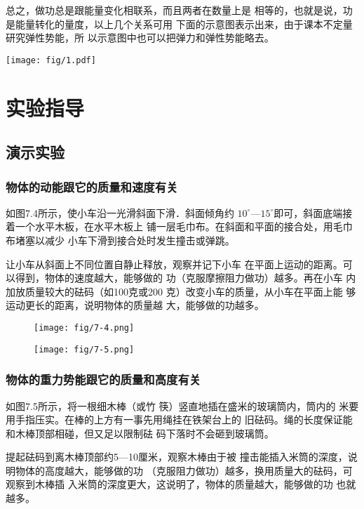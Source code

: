 总之，做功总是跟能量变化相联系，而且两者在数量上是
相等的，也就是说，功是能量转化的量度，以上几个关系可用
下面的示意图表示出来，由于课本不定量研究弹性势能，所
以示意图中也可以把弹力和弹性势能略去。

\begin{center}
\texttt{[image: fig/1.pdf]}
\end{center}

\section{实验指导}
\subsection{演示实验}
\subsubsection{物体的动能跟它的质量和速度有关}
如图7.4所示，使小车沿一光滑斜面下滑．斜面倾角约
$10^{\circ}$—$15^{\circ}$即可，斜面底端接着一个水平木板，在水平木板上
铺一层毛巾布。在斜面和平面的接合处，用毛巾布堵塞以减少
小车下滑到接合处时发生撞击或弹跳。

让小车从斜面上不同位置自静止释放，观察并记下小车
在平面上运动的距离。可以得到，物体的速度越大，能够做的
功（克服摩擦阻力做功）越多。再在小车
内加放质量较大的砝码（如100克或200
克）改变小车的质量，从小车在平面上能
够运动更长的距离，说明物体的质量越
大，能够做的功越多。

\begin{figure}[htp]\centering
    \begin{minipage}[t]{0.48\textwidth}
    \centering
\texttt{[image: fig/7-4.png]}
    \caption{}
    \end{minipage}
    \begin{minipage}[t]{0.48\textwidth}
    \centering
\texttt{[image: fig/7-5.png]}
    \caption{}
    \end{minipage}
    \end{figure}


\subsubsection{物体的重力势能跟它的质量和高度有关}
如图7.5所示，将一根细木棒（或竹
筷）竖直地插在盛米的玻璃筒内，筒内的
米要用手指压实。在棒的上方有一事先用绳挂在铁架台上的
旧砝码。绳的长度保证能和木棒顶部相碰，但又足以限制砝
码下落时不会砸到玻璃筒。


提起砝码到离木棒顶部约5—10厘米，观察木棒由于被
撞击能插入米筒的深度，说明物体的高度越大，能够做的功
（克服阻力做功）越多，换用质量大的砝码，可观察到木棒插
入米筒的深度更大，这说明了，物体的质量越大，能够做的功
也就越多。

